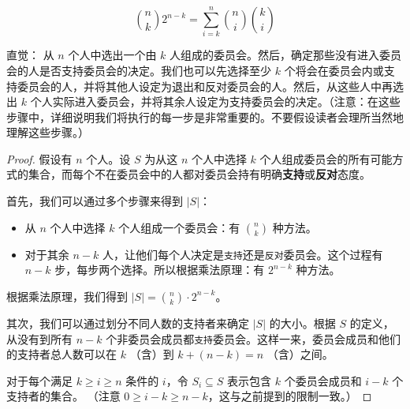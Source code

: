 \begin{example}[支持/反对委员会恒等式]
    \[{n \choose k}2^{n-k} = \sum_{i=k}^{n}{n \choose i}{k \choose i}\]

    \begin{questions}{直觉：}
        从 $n$ 个人中选出一个由 $k$ 人组成的委员会。然后，确定那些没有进入委员会的人是否支持委员会的决定。我们也可以先选择至少 $k$ 个将会在委员会内或支持委员会的人，并将其他人设定为退出和反对委员会的人。然后，从这些人中再选出 $k$ 个人实际进入委员会，并将其余人设定为支持委员会的决定。（注意：在这些步骤中，详细说明我们将执行的每一步是非常重要的。不要假设读者会理所当然地理解这些步骤。）
    \end{questions}

    \begin{proof}
        假设有 $n$ 个人。设 $S$ 为从这 $n$ 个人中选择 $k$ 个人组成委员会的所有可能方式的集合，而每个不在委员会中的人都对委员会持有明确\textbf{支持}或\textbf{反对}态度。

        首先，我们可以通过多个步骤来得到 $|S|$：
        \begin{itemize}
            \item 从 $n$ 个人中选择 $k$ 个人组成一个委员会：有 ${n \choose k}$ 种方法。
            \item 对于其余 $n-k$ 人，让他们每个人决定是\verb|支持|还是\verb|反对|委员会。这个过程有 $n-k$ 步，每步两个选择。所以根据乘法原理：有 $2^{n-k}$ 种方法。
        \end{itemize}
        根据乘法原理，我们得到 $|S| = {n \choose k} \cdot 2^{n-k}$。

        其次，我们可以通过划分不同人数的支持者来确定 $|S|$ 的大小。根据 $S$ 的定义，从没有到所有 $n-k$ 个非委员会成员都\verb|支持|委员会。这样一来，委员会成员和他们的支持者总人数可以在 $k$ （含）到 $k + (n - k) = n$ （含）之间。

        对于每个满足 $k \ge i \ge n$ 条件的 $i$，令 $S_i \subseteq S$ 表示包含 $k$ 个委员会成员和 $i - k$ 个支持者的集合。 （注意 $0 \ge i - k \ge n - k$，这与之前提到的限制一致。）


\end{proof}
\end{example}
